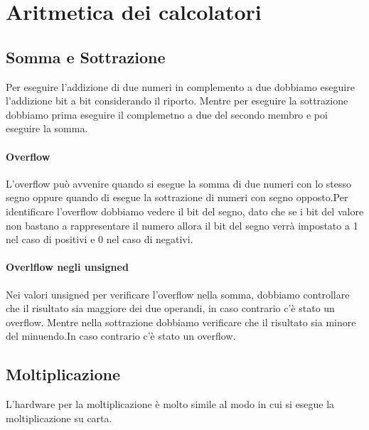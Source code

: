 \section{Aritmetica dei calcolatori}

\subsection{Somma e Sottrazione}
Per eseguire l'addizione di due numeri in complemento 
a due dobbiamo eseguire l'addizione bit a bit considerando il riporto.
Mentre per eseguire la sottrazione dobbiamo prima eseguire il complemetno 
a due del secondo membro e poi eseguire la somma.
\paragraph{Overflow}
L'overflow può avvenire quando si esegue la somma di due 
numeri con lo stesso segno oppure quando di esegue la sottrazione di 
numeri con segno opposto.Per identificare l'overflow dobbiamo vedere il 
bit del segno, dato che se i bit del valore non bastano a rappresentare il numero
allora il bit del segno verrà impostato a 1 nel caso di positivi e 0 nel caso di negativi.

\paragraph{Overlflow negli unsigned}
Nei valori unsigned per verificare l'overflow nella somma,
dobbiamo controllare che il risultato sia maggiore dei due
operandi, in caso contrario c'è stato un overflow.
Mentre nella sottrazione dobbiamo verificare che il 
risultato sia minore del minuendo.In caso contrario c'è stato un overflow.
\subsection{Moltiplicazione}

L'hardware per la moltiplicazione è molto simile al modo in cui si esegue la moltiplicazione su carta.

